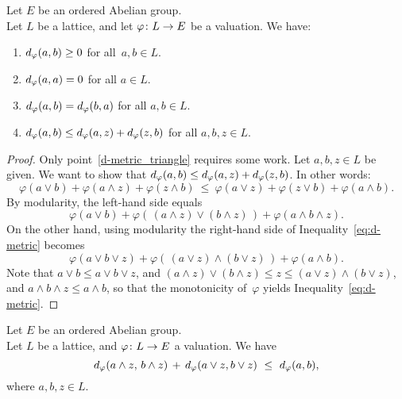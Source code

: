 \documentclass[main.tex]{subfiles}
\begin{document}
%
%
\begin{lem}
\label{L:d-metric}
Let $E$ be an ordered Abelian group.\\
Let $L$ be a lattice,
and let $\varphi\colon L \rightarrow E$ be a valuation.
We have:
\begin{enumerate}
\item \label{d-metric_pos}
$d_{\smash{\varphi}}(a,b)\geq 0$ for all~$a,b\in L$.
\item\label{d-metric_self} 
$d_{\smash{\varphi}}(a,a)=0$ for all $a\in L$.
\item\label{d-metric_sym}
$d_{\smash{\varphi}}(a,b)=d_{\smash{\varphi}}(b,a)$ for all $a,b\in L$.
\item\label{d-metric_triangle}
$d_{\smash{\varphi}}(a,b)\leq d_{\smash{\varphi}}(a,z)+d_{\smash{\varphi}}(z,b)$
for all $a,b,z\in L$.
\end{enumerate}
\end{lem}
\begin{proof}
Only point~\ref{d-metric_triangle} requires some work.
Let $a,b,z\in L$ be given.
We want to show that $d_{\smash{\varphi}}(a,b) \leq d_{\smash{\varphi}}(a,z)+d_{\smash{\varphi}}(z,b)$.
In other words:
\begin{equation}
\label{eq:d-metric}
\varphi(a\vee b) + \varphi(a\wedge z) + \varphi (z\wedge b)
\ \leq\ 
\varphi (a\vee z) + \varphi(z\vee b) + \varphi (a\wedge b)\text{.}
\end{equation}
By modularity,
the left-hand side equals
\begin{equation*}
\varphi(a\vee b) 
 + \varphi(\,(a\wedge z)\vee(b\wedge z)\,)
 + \varphi(a\wedge b\wedge z).
\end{equation*}
On the other hand,
using modularity
the right-hand side of Inequality~\eqref{eq:d-metric} becomes
\begin{equation*}
\varphi(a\vee b\vee z)
 + \varphi(\,(a\vee z)\wedge(b\vee z)\,)
 + \varphi(a\wedge b).
\end{equation*}
Note that $a\vee b \leq a\vee b\vee z$,
and $(a\wedge z)\vee (b\wedge z) \leq z \leq (a\vee z)\wedge (b\vee z)$,
and $a\wedge b\wedge z \leq a\wedge b$,
so that the monotonicity of~$\varphi$ yields Inequality~\eqref{eq:d-metric}.
\end{proof}
%
%
\begin{lem}
\label{L:curry-wc-unif}
Let $E$ be an ordered Abelian group.\\
Let $L$ be a lattice,
and $\varphi\colon L \rightarrow E$ a valuation.
We have
\begin{equation*}
d_{\smash{\varphi}}(a\wedge z,\,b\wedge z)\,+\,
 d_{\smash{\varphi}}(a\vee z,b\vee z)\ \leq\ d_{\smash{\varphi}}(a,b),
\end{equation*}
where $a,b,z\in L$.
\end{lem}
\end{document}
